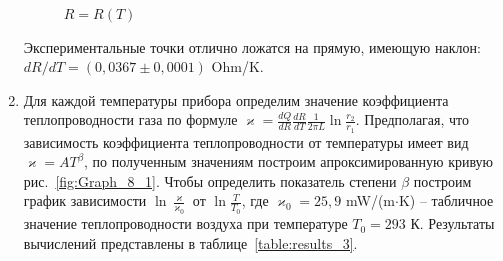 \documentclass[a4paper,12pt]{article} %
\begin{document}
\begin{enumerate}
\begin{figure}[h]
	\caption{$R = R(T)$}
	\label{ris:Graph_7}
\end{figure}

	Экспериментальные точки отлично ложатся на прямую, имеющую наклон: $dR/dT = (0,0367 \pm 0,0001)$ Ohm/K.

	
\item
	Для каждой температуры прибора определим значение коэффициента теплопроводности газа по формуле $\varkappa = \frac{dQ}{dR} \frac{dR}{dT} \frac{1}{2\pi L} \ln \frac{r_2}{r_1}$. Предполагая, что зависимость коэффициента теплопроводности от температуры имеет вид $\varkappa = AT^\beta$, по полученным значениям построим апроксимированную кривую рис.~\ref{fig:Graph_8_1}. Чтобы определить показатель степени $\beta$ построим график зависимости $\ln {\frac{\varkappa}{\varkappa_0}}$ от $\ln {\frac{T}{T_0}}$, где $\varkappa_0 = 25,9$ mW/(m$\cdot$K) -- табличное значение теплопроводности воздуха при температуре $T_0 = 293$ К. Результаты вычислений представлены в таблице~\ref{table:results_3}.
	

\end{enumerate}
\end{document}
